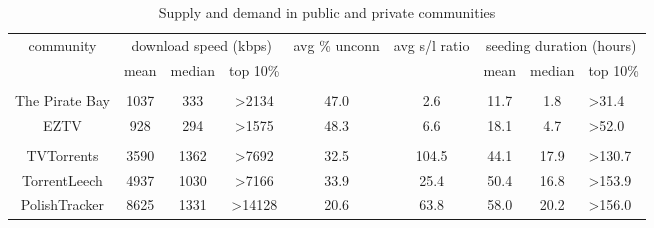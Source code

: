 \begin{table}[]
	\centering
	\caption{Supply and demand in public and private communities \cite{2010:pubpriv:meulpolder}}
	\label{tbl:supdemand}
	\begin{adjustwidth}{-1.5cm}{}
	\begin{tabular}{|c|c|c|c|c|c|c|c|l|}
		\hline
		\multicolumn{1}{|c|}{\multirow{2}{0.1\linewidth}{community}} &  \multicolumn{3}{c|}{download speed (kbps)} & \multicolumn{1}{c|}{\multirow{2}{0.1\linewidth}{avg \% unconn}} & \multicolumn{1}{c|}{\multirow{2}{0.1\linewidth}{avg s/l ratio}} & \multicolumn{3}{c|}{seeding duration (hours)} \\ \cline{2-4} \cline{7-9} 
		\multicolumn{1}{|c|}{} & {mean} & {median} & {top 10\%} & {} & {} & {mean} & {median} & {top 10\%} \\ \hline
		\multicolumn{8}{l}{} \\ \hline
		The Pirate Bay & {1037} & {333} & {\textgreater2134} & {47.0} & {2.6} & {11.7} & {1.8} & {\textgreater31.4} \\ \hline
		EZTV  & {928} & {294} & {\textgreater1575} & {48.3} & {6.6} & {18.1} & {4.7} & {\textgreater52.0} \\ \hline
		\multicolumn{8}{l}{} \\ \hline
		TVTorrents & 3590 & 1362 & \textgreater7692 & 32.5 & 104.5 & 44.1 & 17.9 & \textgreater130.7 \\ \hline
		TorrentLeech  & {4937} & {1030} & {\textgreater7166} & {33.9} & {25.4} & {50.4} & {16.8} & {\textgreater153.9} \\ \hline
		PolishTracker  & {8625} & {1331} & {\textgreater14128} & {20.6} & {63.8} & {58.0} & {20.2} & {\textgreater156.0} \\ \hline
	\end{tabular}
		\end{adjustwidth}
\end{table}

